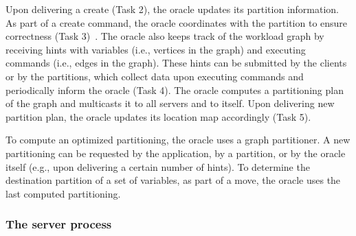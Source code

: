 Upon delivering a create (Task 2), the oracle updates its partition information.
As part of a create command, the oracle coordinates with the partition to ensure
correctness (Task 3)~\cite{bezerra2014ssmr}.
%
The oracle also keeps track of the workload graph by receiving hints with
variables (i.e., vertices in the graph) and executing commands (i.e., edges in
the graph). These hints can be submitted by the clients or by the partitions,
which collect data upon executing commands and periodically inform the oracle
(Task 4). The oracle computes a partitioning plan of the graph and multicasts it
to all servers and to itself. Upon delivering new partition plan, the oracle
updates its location map accordingly (Task 5).

To compute an optimized partitioning, the oracle uses a graph partitioner. A new
partitioning can be requested by the application, by a partition, or by the
oracle itself (e.g., upon delivering a certain number of hints). To determine
the destination partition of a set of variables, as part of a move, the oracle
uses
the last computed partitioning.

\subsubsection{The server process}

